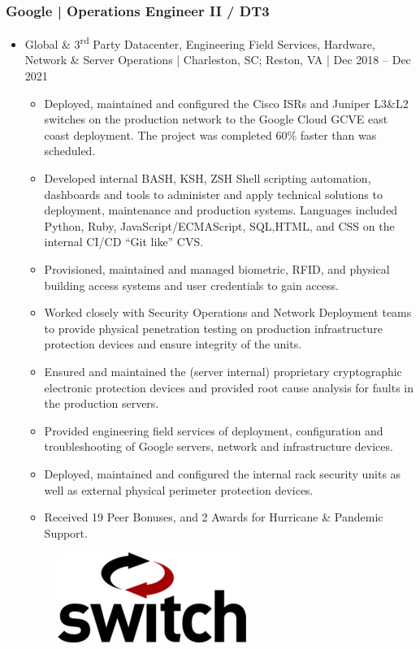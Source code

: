 \documentclass[letter,10pt]{article}
\begin{document}
\subsubsection*{Google | Operations Engineer II / DT3}
\label{sec:org0bfbbee}
\begin{itemize}
\item Global \& 3\textsuperscript{rd} Party Datacenter, Engineering Field Services, Hardware, Network \& Server Operations | Charleston, SC; Reston, VA | Dec 2018 – Dec 2021
\label{sec:org8e51e29}
\begin{itemize}
\item Deployed, maintained and configured the Cisco ISRs and Juniper L3\&L2 switches on the production network to the Google Cloud GCVE east coast deployment. The project was completed 60\% faster than was scheduled.
\item Developed internal BASH, KSH, ZSH Shell scripting automation, dashboards and tools to administer and apply technical solutions to deployment, maintenance and production systems. Languages included Python, Ruby, JavaScript/ECMAScript, SQL,HTML, and CSS on the internal CI/CD “Git like” CVS.
\item Provisioned, maintained and managed biometric, RFID, and physical building access systems and user credentials to gain access.
\item Worked closely with Security Operations and Network Deployment teams to provide physical penetration testing on production infrastructure protection devices and ensure integrity of the units.
\item Ensured and maintained the (server internal) proprietary cryptographic electronic protection devices and provided root cause analysis for faults in the production servers.
\item Provided engineering field services of deployment, configuration and troubleshooting of Google servers, network and infrastructure devices.
\item Deployed, maintained and configured the internal rack security units as well as external physical perimeter protection devices.
\item Received 19 Peer Bonuses, and 2 Awards for Hurricane \& Pandemic Support.
\end{itemize}



\begin{figure}
\includegraphics[width=0.8\linewidth]{./img/50p_cr_switch.jpg}
\end{figure}
\end{itemize}
\end{document}
